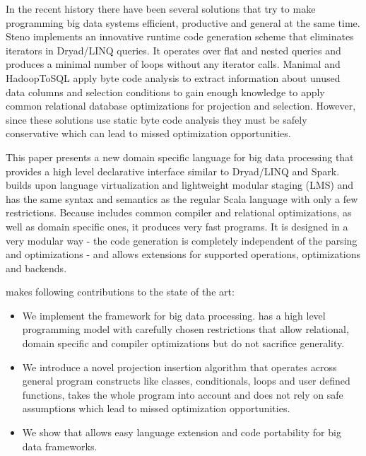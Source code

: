 In the recent history there have been several solutions that try to make programming big data systems efficient, productive and general at the same time. Steno \cite{murray_steno:_2011} implements an innovative runtime code generation scheme that eliminates iterators in Dryad/LINQ queries. It operates over flat and nested queries and produces a minimal number of loops without any iterator calls. Manimal \cite{jahani_automatic_2011} and HadoopToSQL \cite{iu_hadooptosql:_2010} apply byte code analysis to extract information about unused data columns and selection conditions to gain enough knowledge to apply common relational database optimizations for projection and selection. However, since these solutions use static byte code analysis they must be safely conservative which can lead to missed optimization opportunities.

This paper presents a new domain specific language \tool for big data processing that provides a high level declarative interface similar to Dryad/LINQ and Spark. \tool builds upon language virtualization \cite{moors_scala-virtualized_2012} and lightweight modular staging \cite{rompf_lightweight_2010} (LMS) and has the same syntax and semantics as the regular Scala language with only a few restrictions.
Because \tool includes common compiler and relational optimizations, as well as domain specific ones, it produces very fast programs. It is designed in a very modular way - the code generation is completely independent of the parsing and optimizations - and allows extensions for supported operations, optimizations and backends. 

\tool makes following contributions to the state of the art:    
\begin{itemize}

  \item We implement the \tool framework for big data processing. \tool has a high level programming model with carefully chosen restrictions that allow relational, domain specific and compiler optimizations but do not sacrifice generality.

  \item We introduce a novel projection insertion algorithm that operates across general program constructs like classes, conditionals, loops and user defined functions, takes the whole program into account and does not rely on safe assumptions which lead to missed optimization opportunities.  

  \item We show that \tool allows easy language extension and code portability for big data frameworks. 

\end{itemize} 

